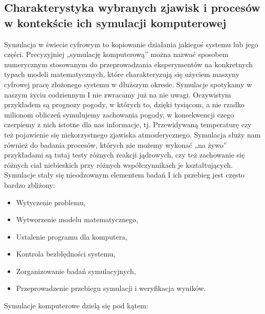 \subsection{Charakterystyka wybranych zjawisk i procesów w kontekście ich symulacji komputerowej}

Symulacja w świecie cyfrowym to kopiowanie działania jakiegoś systemu lub jego części. Precyzyjniej „symulację komputerową” można nazwać sposobem numerycznym stosowanym do przeprowadzania eksperymentów na konkretnych typach modeli matematycznych, które charakteryzują się użyciem maszyny cyfrowej pracę złożonego systemu w dłuższym okresie. Symulacje spotykamy w naszym życiu codziennym I nie zwracamy już na nie uwagi. Oczywistym przykładem są prognozy pogody, w których to, dzięki tysiącom, a nie rzadko milionom obliczeń symulujemy zachowania pogody, w konsekwencji czego czerpiemy z nich istotne dla nas informacje, tj. Przewidywaną temperaturę czy też pojawienie się niekorzystnego zjawiska atmosferycznego. Symulacja służy nam również do badania procesów, których nie możemy wykonać „na żywo” przykładami są tutaj testy różnych reakcji jądrowych, czy też zachowanie się różnych ciał niebieskich przy różnych współczynnikach je kształtujących. Symulacje stały się nieodzownym elementem badań I ich przebieg jest często bardzo zbliżony:

\begin{itemize}
	\item Wytyczenie problemu,
	\item Wytworzenie modelu matematycznego,
	\item Ustalenie programu dla komputera,
	\item Kontrola bezbłędności systemu,
	\item Zorganizowanie badań symulacyjnych,
	\item Przeprowadzenie przebiegu symulacji i weryfikacja wyników.
\end{itemize}

Symulacje komputerowe dzielą się pod kątem:

